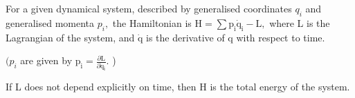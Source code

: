 For a given dynamical system, described by generalised coordinates $q_{i}$ 
and generalised momenta $p_{i},$  the Hamiltonian is 
$ \mathrm{H} = \sum \mathrm{p}_{\mathrm{i}} \dot{\mathrm{q}}_{\mathrm{i}} - \mathrm{L} , $
where L is the Lagrangian of the system, and $ \dot{\mathrm{q}} $ is the derivative
of q with respect to time.
\par $(p_{i}$  are given by $ \mathrm{p}_{\mathrm{i}} = \frac{\partial \mathrm{L}}
{\partial \dot{\mathrm{q}}_{\mathrm{i}}} . $ )
\par
If L does not depend explicitly on time, then H is the total energy of the
system.